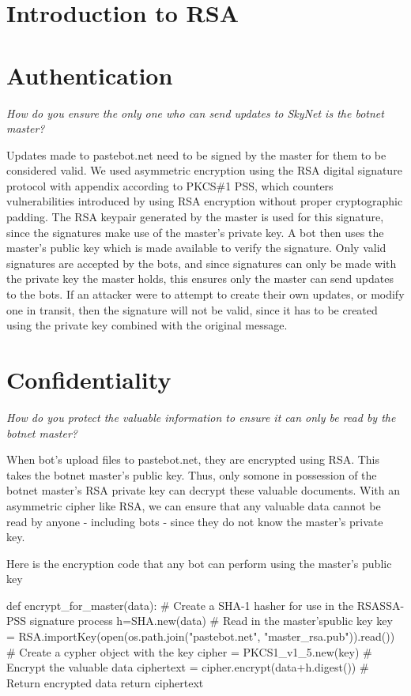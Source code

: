 \documentclass[9pt,a4paper]{article}
\begin{document}
\maketitle
\small
\setlength{\parindent}{0pt}

\section{Introduction to RSA}

\section{Authentication}
\emph{How do you ensure the only one who can send updates to SkyNet is the botnet master?}

Updates made to pastebot.net need to be signed by the master for them to be considered valid. We used asymmetric encryption using the RSA digital signature protocol with appendix according to PKCS\#1 PSS, which counters vulnerabilities introduced by using RSA encryption without proper cryptographic padding. The RSA keypair generated by the master is used for this signature, since the signatures make use of the master's private key. A bot then uses the master's public key which is made available to verify the signature. Only valid signatures are accepted by the bots, and since signatures can only be made with the private key the master holds, this ensures only the master can send updates to the bots. If an attacker were to attempt to create their own updates, or modify one in transit, then the signature will not be valid, since it has to be created using the private key combined with the original message.

\section{Confidentiality}
\emph{How do you protect the valuable information to ensure it can only  be read by the botnet master?}

When bot's upload files to pastebot.net, they are encrypted using RSA. This takes the botnet master's public key. Thus, only somone in possession of the botnet master's RSA private key can decrypt these valuable documents. With an asymmetric cipher like RSA, we can ensure that any valuable data cannot be read by anyone - including bots - since they do not know the master's private key.

Here is the encryption code that any bot can perform using the master's public key
\begin{center}
\vspace{-2ex}
\begin{python}
def encrypt_for_master(data):
    # Create a SHA-1 hasher for use in the RSASSA-PSS signature process
    h=SHA.new(data)
    # Read in the master'spublic key
    key = RSA.importKey(open(os.path.join("pastebot.net", "master_rsa.pub")).read())
    # Create a cypher object with the key
    cipher = PKCS1_v1_5.new(key)
    # Encrypt the valuable data
    ciphertext = cipher.encrypt(data+h.digest())
    # Return encrypted data
    return ciphertext
\end{python}
\end{center}
\end{document}
